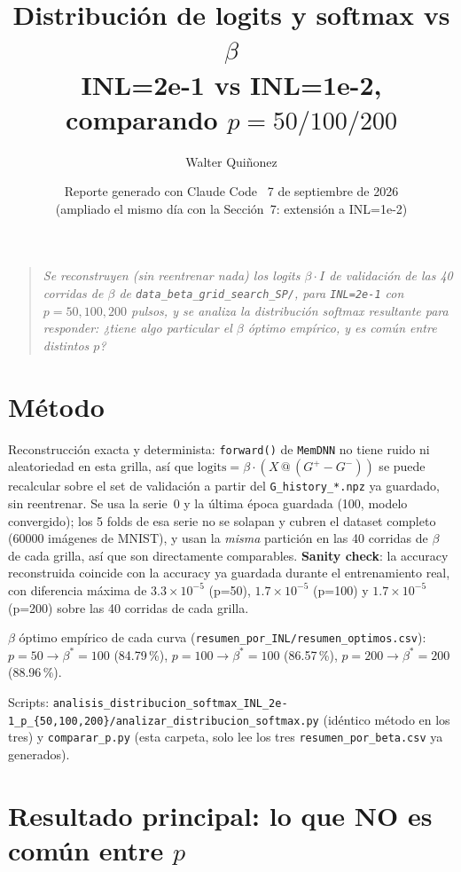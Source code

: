 \documentclass[11pt]{article}
\title{\textbf{Distribución de logits y softmax vs $\beta$\\
INL=2e-1 vs INL=1e-2, comparando $p=50/100/200$}}
\author{Walter Quiñonez}
\date{Reporte generado con Claude Code \textperiodcentered\ 7 de septiembre de 2026\\
\small (ampliado el mismo día con la Sección~7: extensión a INL=1e-2)}
\begin{document}
\maketitle

\begin{quote}\itshape
Se reconstruyen (sin reentrenar nada) los logits $\beta\cdot I$ de
validación de las 40 corridas de $\beta$ de \texttt{data\_beta\_grid\_search\_SP/},
para \texttt{INL=2e-1} con $p=50,100,200$ pulsos, y se analiza la
distribución softmax resultante para responder: ¿tiene algo particular el
$\beta$ óptimo empírico, y es común entre distintos $p$?
\end{quote}

\tableofcontents

\section{Método}

Reconstrucción exacta y determinista: \texttt{forward()} de \texttt{MemDNN}
no tiene ruido ni aleatoriedad en esta grilla, así que
$\text{logits} = \beta\cdot(X \,@\, (G^+-G^-))$ se puede recalcular sobre el
set de validación a partir del \texttt{G\_history\_*.npz} ya guardado, sin
reentrenar. Se usa la serie~0 y la última época guardada (100, modelo
convergido); los 5 folds de esa serie no se solapan y cubren el dataset
completo (60000 imágenes de MNIST), y usan la \emph{misma} partición en las
40 corridas de $\beta$ de cada grilla, así que son directamente
comparables. \textbf{Sanity check}: la accuracy reconstruida coincide con
la accuracy ya guardada durante el entrenamiento real, con diferencia
máxima de $3.3\times10^{-5}$ (p=50), $1.7\times10^{-5}$ (p=100) y
$1.7\times10^{-5}$ (p=200) sobre las 40 corridas de cada grilla.

$\beta$ óptimo empírico de cada curva (\texttt{resumen\_por\_INL/resumen\_optimos.csv}):
$p{=}50\rightarrow\beta^*{=}100$ (84.79\,\%), $p{=}100\rightarrow\beta^*{=}100$
(86.57\,\%), $p{=}200\rightarrow\beta^*{=}200$ (88.96\,\%).

Scripts: \texttt{analisis\_distribucion\_softmax\_INL\_2e-1\_p\_\{50,100,200\}/analizar\_distribucion\_softmax.py}
(idéntico método en los tres) y \texttt{comparar\_p.py} (esta carpeta, solo
lee los tres \texttt{resumen\_por\_beta.csv} ya generados).

\section{Resultado principal: lo que NO es común entre $p$}
\end{document}
